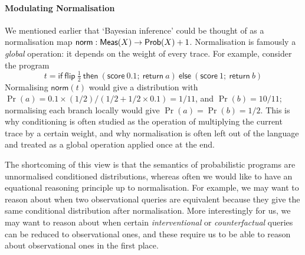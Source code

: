 \documentclass[11pt,a4paper]{article}
\begin{document}
\paragraph{Modulating Normalisation}\label{par:norm} We mentioned earlier that `Bayesian inference' could be thought of as a normalisation map $\mathsf{norm}: \mathsf{Meas}(X) \to \mathsf{Prob}(X) + 1$. Normalisation is famously a \emph{global} operation: it depends on the weight of every trace. For example, consider the program
\[
t = \mathsf{if}\ \mathsf{flip}\ \tfrac12\ \mathsf{then}\ (\mathsf{score}\ 0.1;\ \mathsf{return}\ a)\ \mathsf{else}\ (\mathsf{score}\ 1;\ \mathsf{return}\ b)
\]
Normalising $\mathsf{norm}(t)$ would give a distribution with $\Pr(a) = 0.1 \times (1/2) / (1/2 + 1/2 \times 0.1) = 1/11$, and $\Pr(b) = 10/11$; normalising each branch locally would give $\Pr(a) = \Pr(b) = 1/2$. This is why conditioning is often studied as the operation of multiplying the current trace by a certain weight, and why normalisation is often left out of the language and treated as a global operation applied once at the end. 

The shortcoming of this view is that the semantics of probabilistic programs are unnormalised conditioned distributions, whereas often we  would like to have an equational reasoning principle up to normalisation. For example, we may want to reason about when two observational queries are equivalent because they give the same conditional distribution after normalisation. More interestingly for us, we may want to reason about when certain \emph{interventional} or \emph{counterfactual} queries can be reduced to observational ones, and these require us to be able to reason about observational ones in the first place. 
\end{document}

